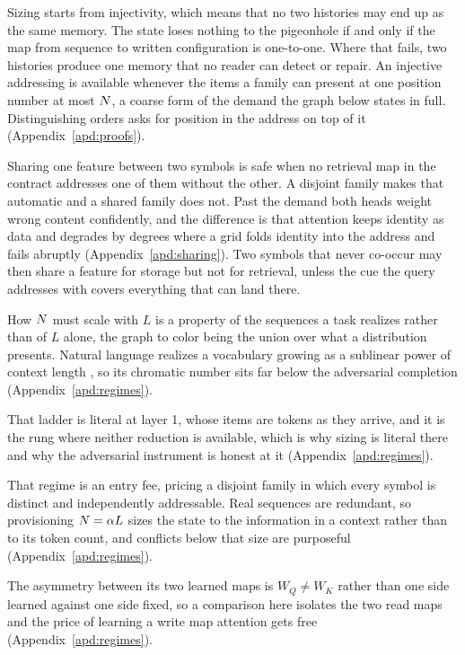 Sizing starts from injectivity, which means that no two histories may end up as the same memory. The state loses nothing to the pigeonhole if and only if the map from sequence to written configuration is one-to-one. Where that fails, two histories produce one memory that no reader can detect or repair. An injective addressing is available whenever the items a family can present at one position number at most $N$, a coarse form of the demand the graph below states in full. Distinguishing orders asks for position in the address on top of it (Appendix~\ref{apd:proofs}).

Sharing one feature between two symbols is safe when no retrieval map in the contract addresses one of them without the other. A disjoint family makes that automatic and a shared family does not. Past the demand both heads weight wrong content confidently, and the difference is that attention keeps identity as data and degrades by degrees where a grid folds identity into the address and fails abruptly (Appendix~\ref{apd:sharing}). Two symbols that never co-occur may then share a feature for storage but not for retrieval, unless the cue the query addresses with covers everything that can land there.

How $N$ must scale with $L$ is a property of the sequences a task realizes rather than of $L$ alone, the graph to color being the union over what a distribution presents. Natural language realizes a vocabulary growing as a sublinear power of context length \citep{heaps1978}, so its chromatic number sits far below the adversarial completion (Appendix~\ref{apd:regimes}).

That ladder is literal at layer 1, whose items are tokens as they arrive, and it is the rung where neither reduction is available, which is why sizing is literal there and why the adversarial instrument is honest at it (Appendix~\ref{apd:regimes}).

That regime is an entry fee, pricing a disjoint family in which every symbol is distinct and independently addressable. Real sequences are redundant, so provisioning $N = \alpha L$ sizes the state to the information in a context rather than to its token count, and conflicts below that size are purposeful (Appendix~\ref{apd:regimes}).

The asymmetry between its two learned maps is $W_Q \neq W_K$ rather than one side learned against one side fixed, so a comparison here isolates the two read maps and the price of learning a write map attention gets free (Appendix~\ref{apd:regimes}).

